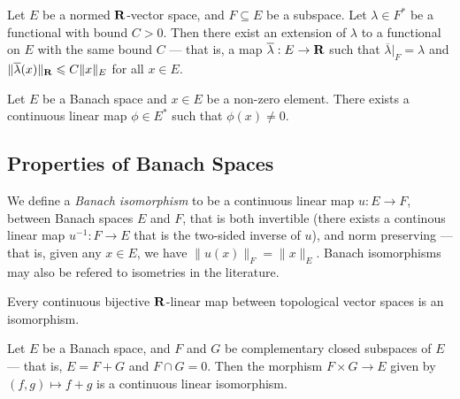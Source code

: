 \begin{theorem}
\label{thm:Hahn-Banach}
Let \(E\) be a normed \(\mathbf{R}\)-vector space, and \(F \subseteq E\) be a
subspace. Let \(\lambda \in F^{*}\) be a functional with bound \(C > 0\). Then
there exist an extension of \(\lambda\) to a functional on \(E\) with the same
bound \(C\) --- that is, a map \(\overline \lambda: E \to \mathbf{R}\) such that
\(\overline\lambda|_F = \lambda\) and \(\|\overline\lambda(x)\|_{\mathbf{R}} \leqslant C
\|x\|_{E}\) for all \(x \in E\).
\end{theorem}

\begin{corollary}
\label{cor:Hahn-Banach}
Let \(E\) be a Banach space and \(x \in E\) be a non-zero element. There exists
a continuous linear map \(\phi \in E^{*}\) such that \(\phi(x) \neq 0\).
\end{corollary}

\subsection{Properties of Banach Spaces}

\begin{definition}
\label{def:banach-isomorphism}
We define a \emph{Banach isomorphism} to be a continuous linear map \(u: E \to
F\), between Banach spaces \(E\) and \(F\), that is both invertible (there
exists a continous linear map \(u^{-1}: F \to E\) that is the two-sided inverse
of \(u\)), and norm preserving --- that is, given any \(x \in E\), we have
\(\|u(x)\|_F = \|x\|_E\). Banach isomorphisms may also be refered to
isometries in the literature.
\end{definition}

\begin{proposition}
\label{prop:continuous-bijective-linear-is-isomorphism}
Every continuous bijective \(\mathbf{R}\)-linear map between topological vector spaces
is an isomorphism.
\end{proposition}

\begin{proposition}[Splitting]
\label{prop:banach-split}
Let \(E\) be a Banach space, and \(F\) and \(G\) be complementary closed
subspaces of \(E\) --- that is, \(E = F + G\) and \(F \cap G = 0\). Then the
morphism \(F \times G \to E\) given by \((f, g) \mapsto f + g\) is a continuous
linear isomorphism.
\end{proposition}

